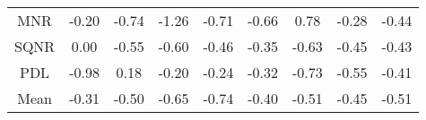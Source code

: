 \begin{longtable}{ | c || c | c | c | c | c | c | c || c |}
MNR &  \cellcolor[HTML]{FFF7F7} -0.20 &  \cellcolor[HTML]{FFEFEF} -0.74 &  \cellcolor[HTML]{FFDFDF} -1.26 &  \cellcolor[HTML]{FFEFEF} -0.71 &  \cellcolor[HTML]{FFEFEF} -0.66 &  \cellcolor[HTML]{EFEFFF} 0.78 &  \cellcolor[HTML]{FFF7F7} -0.28 &  \cellcolor[HTML]{FFF7F7} -0.44 \\
SQNR &  \cellcolor[HTML]{FFFFFF} 0.00 &  \cellcolor[HTML]{FFEFEF} -0.55 &  \cellcolor[HTML]{FFEFEF} -0.60 &  \cellcolor[HTML]{FFF7F7} -0.46 &  \cellcolor[HTML]{FFF7F7} -0.35 &  \cellcolor[HTML]{FFEFEF} -0.63 &  \cellcolor[HTML]{FFF7F7} -0.45 &  \cellcolor[HTML]{FFF7F7} -0.43 \\
PDL &  \cellcolor[HTML]{FFE7E7} -0.98 &  \cellcolor[HTML]{F7F7FF} 0.18 &  \cellcolor[HTML]{FFF7F7} -0.20 &  \cellcolor[HTML]{FFF7F7} -0.24 &  \cellcolor[HTML]{FFF7F7} -0.32 &  \cellcolor[HTML]{FFEFEF} -0.73 &  \cellcolor[HTML]{FFEFEF} -0.55 &  \cellcolor[HTML]{FFF7F7} -0.41 \\
\hline
\hline
Mean  &  \cellcolor[HTML]{FFF7F7} -0.31 &  \cellcolor[HTML]{FFEFEF} -0.50 &  \cellcolor[HTML]{FFEFEF} -0.65 &  \cellcolor[HTML]{FFEFEF} -0.74 &  \cellcolor[HTML]{FFF7F7} -0.40 &  \cellcolor[HTML]{FFEFEF} -0.51 &  \cellcolor[HTML]{FFF7F7} -0.45 &  \cellcolor[HTML]{FFEFEF} -0.51 \\
\hline
\end{longtable}